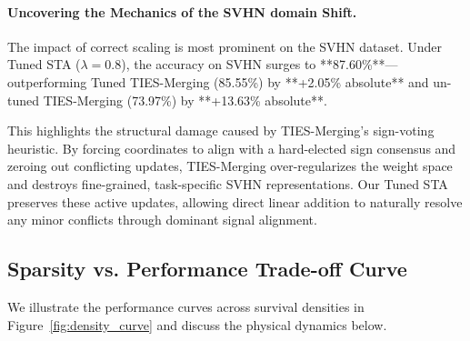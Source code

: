 \paragraph{Uncovering the Mechanics of the SVHN domain Shift.}
The impact of correct scaling is most prominent on the SVHN dataset. Under Tuned STA ($\lambda=0.8$), the accuracy on SVHN surges to **87.60\%**—outperforming Tuned TIES-Merging (85.55\%) by **+2.05\% absolute** and un-tuned TIES-Merging (73.97\%) by **+13.63\% absolute**.

This highlights the structural damage caused by TIES-Merging's sign-voting heuristic. By forcing coordinates to align with a hard-elected sign consensus and zeroing out conflicting updates, TIES-Merging over-regularizes the weight space and destroys fine-grained, task-specific SVHN representations. Our Tuned STA preserves these active updates, allowing direct linear addition to naturally resolve any minor conflicts through dominant signal alignment.

\subsection{Sparsity vs. Performance Trade-off Curve}
We illustrate the performance curves across survival densities in Figure~\ref{fig:density_curve} and discuss the physical dynamics below.

